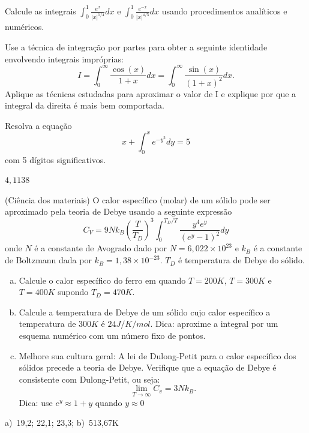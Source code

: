 \begin{exer}Calcule as integrais $\int_0^{1}\frac{e^x}{|x|^{1/4}}dx$ e $\int_0^1\frac{e^{-x}}{|x|^{4/5}}dx$ usando procedimentos analíticos e numéricos.
\end{exer}

\begin{exer} Use a técnica de integração por partes para obter a seguinte identidade envolvendo integrais impróprias:
\begin{equation} I=\int_0^\infty \frac{\cos(x)}{1+x}dx =\int_0^\infty \frac{\sin(x)}{(1+x)^2}dx. \end{equation}
Aplique as técnicas estudadas para aproximar o valor de I e explique por que a integral da direita é mais bem comportada.
\end{exer}

\begin{exer} Resolva a  equação
\begin{equation} x+\int_0^x e^{-y^2}dy=5 \end{equation}
com 5 dígitos significativos.
\end{exer}
\begin{resp}
  $4,1138$
\end{resp}

\begin{exer}(Ciência dos materiais) O calor específico (molar) de um sólido pode ser aproximado pela teoria de Debye usando a seguinte expressão
\begin{equation} C_V=9Nk_B\left(\frac{T}{T_D}\right)^3\int_0^{T_D/T} \frac{y^4e^y}{(e^y-1)^2}dy \end{equation}
onde $N$ é a constante de Avogrado dado por $N=6,022\times 10^{23}$ e $k_B$ é a constante de Boltzmann dada por $k_B=1,38\times 10^{-23}$. $T_D$ é temperatura de Debye do sólido.
\begin{enumerate}[a)]
\item Calcule o calor específico do ferro em quando $T=200K$, $T=300K$ e $T=400K$ supondo $T_D=470K$.
\item Calcule a temperatura de Debye de um sólido cujo calor específico a temperatura de $300K$ é $24J/K/mol$. Dica: aproxime a integral por um esquema numérico com um número fixo de pontos.
\item Melhore sua cultura geral: A lei de Dulong-Petit para o calor específico dos sólidos precede a teoria de Debye. Verifique que a equação de Debye é consistente com Dulong-Petit, ou seja: \begin{equation} \lim_{T\to \infty}C_v=3Nk_B. \end{equation} Dica: use $e^y\approx 1+y$ quando $y\approx 0$
\end{enumerate}
\end{exer}
\begin{resp}
  a)~19,2; 22,1; 23,3; b)~513,67K
\end{resp}

